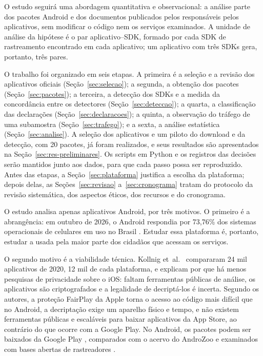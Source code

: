 \label{sec:metodologia}

O estudo seguirá uma abordagem quantitativa e observacional: a análise parte dos pacotes Android e dos documentos publicados pelos responsáveis pelos aplicativos, sem modificar o código nem os serviços examinados. A unidade de análise da hipótese é o par aplicativo--SDK, formado por cada SDK de rastreamento encontrado em cada aplicativo; um aplicativo com três SDKs gera, portanto, três pares.

O trabalho foi organizado em seis etapas. A primeira é a seleção e a revisão dos aplicativos oficiais (Seção~\ref{sec:selecao}); a segunda, a obtenção dos pacotes (Seção~\ref{sec:pacotes}); a terceira, a detecção dos SDKs e a medida da concordância entre os detectores (Seção~\ref{sec:deteccao}); a quarta, a classificação das declarações (Seção~\ref{sec:declaracoes}); a quinta, a observação do tráfego de uma subamostra (Seção~\ref{sec:trafego}); e a sexta, a análise estatística (Seção~\ref{sec:analise}). A seleção dos aplicativos e um piloto do download e da detecção, com 20 pacotes, já foram realizados, e seus resultados são apresentados na Seção~\ref{sec:res-preliminares}. Os scripts em Python e os registros das decisões serão mantidos junto aos dados, para que cada passo possa ser reproduzido. Antes das etapas, a Seção~\ref{sec:plataforma} justifica a escolha da plataforma; depois delas, as Seções~\ref{sec:revisao} a~\ref{sec:cronograma} tratam do protocolo da revisão sistemática, dos aspectos éticos, dos recursos e do cronograma.

\label{sec:plataforma}

O estudo analisa apenas aplicativos Android, por três motivos. O primeiro é a abrangência: em outubro de 2026, o Android respondia por 73,76\% dos sistemas operacionais de celulares em uso no Brasil \cite{statcounter2026}. Estudar essa plataforma é, portanto, estudar a usada pela maior parte dos cidadãos que acessam os serviços.

O segundo motivo é a viabilidade técnica. Kollnig et~al.~\cite{kollnig2022ios} compararam 24 mil aplicativos de 2020, 12 mil de cada plataforma, e explicam por que há menos pesquisas de privacidade sobre o iOS: faltam ferramentas públicas de análise, os aplicativos são criptografados e a legalidade de decriptá-los é incerta. Segundo os autores, a proteção FairPlay da Apple torna o acesso ao código mais difícil que no Android, a decriptação exige um aparelho físico e tempo, e não existem ferramentas públicas e escaláveis para baixar aplicativos da App Store, ao contrário do que ocorre com a Google Play. No Android, os pacotes podem ser baixados da Google Play \cite{apkeep2026}, comparados com o acervo do AndroZoo \cite{allix2016} e examinados com bases abertas de rastreadores \cite{exodus2026,disconnect2026}.

